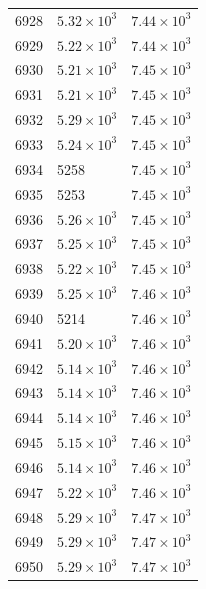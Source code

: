 \begin{table}[H]
\begin{tabular}{lll}
6928 & $\displaystyle 5.32 \times 10^{3}$ & $\displaystyle 7.44 \times 10^{3}$ \\
6929 & $\displaystyle 5.22 \times 10^{3}$ & $\displaystyle 7.44 \times 10^{3}$ \\
6930 & $\displaystyle 5.21 \times 10^{3}$ & $\displaystyle 7.45 \times 10^{3}$ \\
6931 & $\displaystyle 5.21 \times 10^{3}$ & $\displaystyle 7.45 \times 10^{3}$ \\
6932 & $\displaystyle 5.29 \times 10^{3}$ & $\displaystyle 7.45 \times 10^{3}$ \\
6933 & $\displaystyle 5.24 \times 10^{3}$ & $\displaystyle 7.45 \times 10^{3}$ \\
6934 & 5258 & $\displaystyle 7.45 \times 10^{3}$ \\
6935 & 5253 & $\displaystyle 7.45 \times 10^{3}$ \\
6936 & $\displaystyle 5.26 \times 10^{3}$ & $\displaystyle 7.45 \times 10^{3}$ \\
6937 & $\displaystyle 5.25 \times 10^{3}$ & $\displaystyle 7.45 \times 10^{3}$ \\
6938 & $\displaystyle 5.22 \times 10^{3}$ & $\displaystyle 7.45 \times 10^{3}$ \\
6939 & $\displaystyle 5.25 \times 10^{3}$ & $\displaystyle 7.46 \times 10^{3}$ \\
6940 & 5214 & $\displaystyle 7.46 \times 10^{3}$ \\
6941 & $\displaystyle 5.20 \times 10^{3}$ & $\displaystyle 7.46 \times 10^{3}$ \\
6942 & $\displaystyle 5.14 \times 10^{3}$ & $\displaystyle 7.46 \times 10^{3}$ \\
6943 & $\displaystyle 5.14 \times 10^{3}$ & $\displaystyle 7.46 \times 10^{3}$ \\
6944 & $\displaystyle 5.14 \times 10^{3}$ & $\displaystyle 7.46 \times 10^{3}$ \\
6945 & $\displaystyle 5.15 \times 10^{3}$ & $\displaystyle 7.46 \times 10^{3}$ \\
6946 & $\displaystyle 5.14 \times 10^{3}$ & $\displaystyle 7.46 \times 10^{3}$ \\
6947 & $\displaystyle 5.22 \times 10^{3}$ & $\displaystyle 7.46 \times 10^{3}$ \\
6948 & $\displaystyle 5.29 \times 10^{3}$ & $\displaystyle 7.47 \times 10^{3}$ \\
6949 & $\displaystyle 5.29 \times 10^{3}$ & $\displaystyle 7.47 \times 10^{3}$ \\
6950 & $\displaystyle 5.29 \times 10^{3}$ & $\displaystyle 7.47 \times 10^{3}$ \\

\end{tabular}
\end{table}
